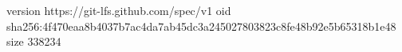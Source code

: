 version https://git-lfs.github.com/spec/v1
oid sha256:4f470eaa8b4037b7ac4da7ab45dc3a245027803823c8fe48b92e5b65318b1e48
size 338234
